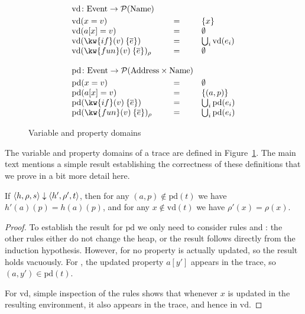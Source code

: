 \documentclass{article}
\begin{document}
\begin{figure}
\[
\begin{array}{lcl}
\multicolumn{2}{l}{\mathrm{vd} \colon \Event \to \mathcal{P}(\Name)}\\[1mm]
\mathrm{vd}(x=v) & = & \{x\} \\
\mathrm{vd}(a[x]=v) & = & \emptyset \\
\mathrm{vd}(\kw{if}(v)\>\{\overline{e}\}) & = & \bigcup_i\mathrm{vd}(e_i) \\
\mathrm{vd}(\kw{fun}(v)\>\{\overline{e}\})_{\rho} & = & \emptyset \\
\\
\multicolumn{2}{l}{\mathrm{pd} \colon \Event \to \mathcal{P}(\Address\times\Name)}\\[1mm]
\mathrm{pd}(x=v) & = & \emptyset \\
\mathrm{pd}(a[x]=v) & = & \{(a,p)\} \\
\mathrm{pd}(\kw{if}(v)\>\{\overline{e}\}) & = & \bigcup_i\mathrm{pd}(e_i) \\
\mathrm{pd}(\kw{fun}(v)\>\{\overline{e}\})_{\rho} & = & \bigcup_i\mathrm{pd}(e_i) \\
\end{array}
\]
\caption{Variable and property domains}\label{fig:vd-pd}
\end{figure}

The variable and property domains of a trace are defined in Figure~\ref{fig:vd-pd}. The main text mentions a simple result establishing the correctness of these definitions that we prove in a bit more detail here.

\begin{lemma}\label{lem:pd-correct}\label{lem:vd-correct}
If $\langle h,\rho,s\rangle\downarrow\langle h',\rho',t\rangle$, then for any $(a,p)\not\in\mathrm{pd}(t)$ we have $h'(a)(p)=h(a)(p)$, and for any $x\not\in\mathrm{vd}(t)$ we have $\rho'(x)=\rho(x)$.
\end{lemma}
\begin{proof}
To establish the result for $\mathrm{pd}$ we only need to consider rules  and : the other rules either do not change the heap, or the result follows directly from the induction hypothesis. However, for  no property is actually updated, so the result holds vacuously. For , the updated property $a[y']$ appears in the trace, so $(a,y')\in\mathrm{pd}(t)$. 

For $\mathrm{vd}$, simple inspection of the rules shows that whenever $x$ is updated in the resulting environment, it also appears in the trace, and hence in $\mathrm{vd}$.
\end{proof}
\end{document}
